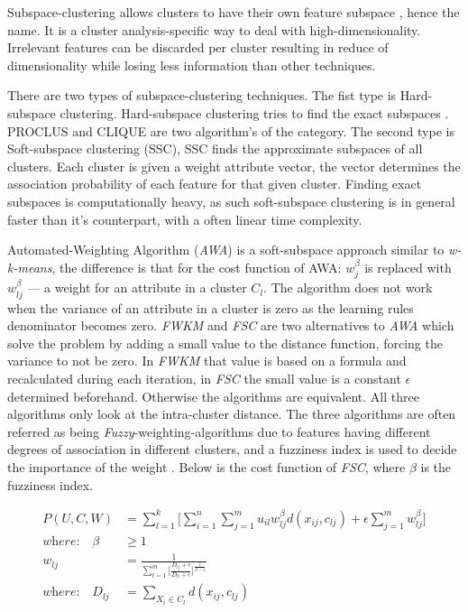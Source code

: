 \documentclass[../report.tex]{subfiles}
\begin{document}
Subspace-clustering allows clusters to have their own feature subspace \cite{Deng2016, Jing2007, Jia2018, Kriegler2012}, hence the name. It is a cluster analysis-specific way to deal with high-dimensionality. Irrelevant features can be discarded per cluster resulting in reduce of dimensionality while losing less information than other techniques.

There are two types of subspace-clustering techniques. The fist type is Hard-subspace clustering. Hard-subspace clustering tries to find the exact subspaces \cite{Kriegler2012, Jia2018, Jing2007,Deng2016}. PROCLUS and CLIQUE are two algorithm's of the category. The second type is Soft-subspace clustering (SSC), SSC finds the approximate subspaces of all clusters. Each cluster is given a weight attribute vector, the vector determines the association probability of each feature for that given cluster\cite{Gan2016}. Finding exact subspaces is computationally heavy, as such soft-subspace clustering is in general faster than it's counterpart, with a often linear time complexity.

Automated-Weighting Algorithm (\textit{AWA}) \cite{Chan2004} is a soft-subspace approach similar to \textit{w-k-means}, the difference is that for the cost function of AWA: $w_j^\beta$ is replaced with $w_{ lj }^\beta$ --- a weight for an attribute in a cluster $C_l$. The algorithm does not work when the variance of an attribute in a cluster is zero as the learning rules denominator becomes zero\cite{Jing2005}. \textit{ FWKM } \cite{Jing2005} and \textit{FSC} are two alternatives to \textit{AWA} which solve the problem by adding a small value to the distance function, forcing the variance to not be zero. In \textit{FWKM} that value is based on a formula and recalculated during each iteration, in \textit{FSC} the small value is a constant $\epsilon$ determined beforehand. Otherwise the algorithms are equivalent. All three algorithms only look at the intra-cluster distance. The three algorithms are often referred as being \textit{Fuzzy}-weighting-algorithms due to features having different degrees of association in different clusters, and a fuzziness index is used to decide the importance of the weight \cite{Gan2006}. Below is the cost function of \textit{FSC}, where $\beta$ is the fuzziness index.

\begin{align}
\label{eq:cost-fsc}
  P(U,C,W) &= \sum^k_{l=1} \Bigg[ \sum^n_{i=1} \sum^m_{j=1} u_{il} w_{ lj }^{\beta} d(x_{ij},c_{lj}) + \epsilon \sum_{j=1}^{m}{ w_{lj}^{\beta} } \Bigg] \\
\textit{where:}\quad\beta&\geq 1 \\
\label{eq:fsc}
w_{lj} &= \frac{1}{{\sum_{t=1}^{m}\Big[\frac{D_{lj} + \epsilon}{D_{lt} + \epsilon}}\Big]^{\frac{1}{\beta - 1}}} \\
\textit{where:}\quad D_{ lj } &= \sum_{X_i \in C_l}{d(x_{ij},c_{ lj })}
\end{align}
\end{document}
